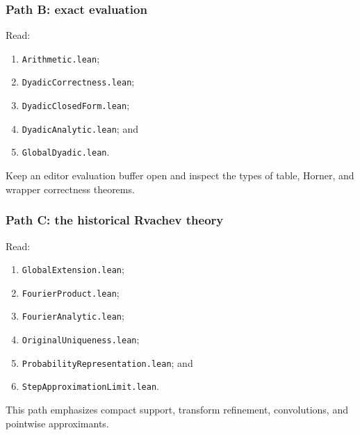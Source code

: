 \documentclass[11pt,oneside]{article}
\theoremstyle{definition}
\theoremstyle{remark}
\begin{document}
\subsubsection{Path B: exact evaluation}
Read:
\begin{enumerate}
  \item \nolinkurl{Arithmetic.lean};
  \item \nolinkurl{DyadicCorrectness.lean};
  \item \nolinkurl{DyadicClosedForm.lean};
  \item \nolinkurl{DyadicAnalytic.lean}; and
  \item \nolinkurl{GlobalDyadic.lean}.
\end{enumerate}
Keep an editor evaluation buffer open and inspect the types of table, Horner, and wrapper correctness theorems.

\subsubsection{Path C: the historical Rvachev theory}
Read:
\begin{enumerate}
  \item \nolinkurl{GlobalExtension.lean};
  \item \nolinkurl{FourierProduct.lean};
  \item \nolinkurl{FourierAnalytic.lean};
  \item \nolinkurl{OriginalUniqueness.lean};
  \item \nolinkurl{ProbabilityRepresentation.lean}; and
  \item \nolinkurl{StepApproximationLimit.lean}.
\end{enumerate}
This path emphasizes compact support, transform refinement, convolutions, and pointwise approximants.
\end{document}
